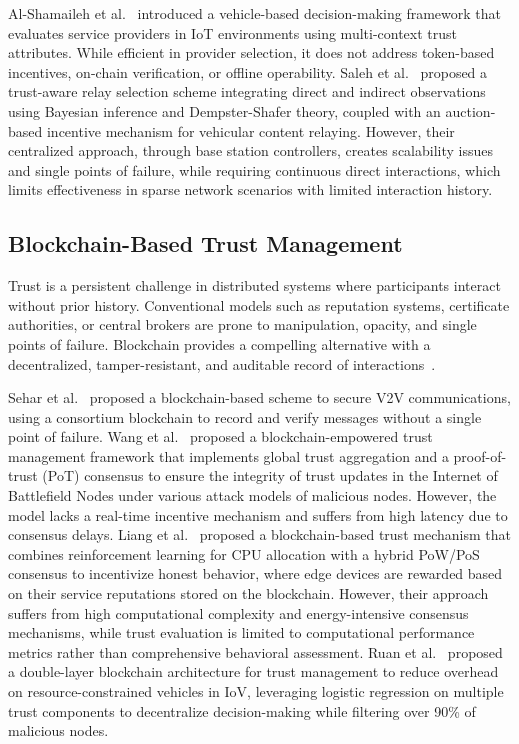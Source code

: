 \cite{cho2010survey}\documentclass[journal,comsoc,twoside]{IEEEtran}
\begin{document}
Al-Shamaileh et al.~\cite{Mohammad} introduced a vehicle-based decision-making framework that evaluates service providers in IoT environments using multi-context trust attributes. While efficient in provider selection, it does not address token-based incentives, on-chain verification, or offline operability. 
Saleh et al.~\cite{Saleh} proposed a trust-aware relay selection scheme integrating direct and indirect observations using Bayesian inference and Dempster-Shafer theory, coupled with an auction-based incentive mechanism for vehicular content relaying. However, their centralized approach, through base station controllers, creates scalability issues and single points of failure, while requiring continuous direct interactions, which limits effectiveness in sparse network scenarios with limited interaction history.

\subsection{Blockchain-Based Trust Management}
Trust is a persistent challenge in distributed systems where participants interact without prior history. Conventional models such as reputation systems, certificate authorities, or central brokers are prone to manipulation, opacity, and single points of failure. Blockchain provides a compelling alternative with a decentralized, tamper-resistant, and auditable record of interactions~\cite{ahakonye2024tides}.

Sehar et al.~\cite{sehar} proposed a blockchain-based scheme to secure V2V communications, using a consortium blockchain to record and verify messages without a single point of failure. 
Wang et al.~\cite{wang} proposed a blockchain-empowered trust management framework that implements global trust aggregation and a proof-of-trust (PoT) consensus to ensure the integrity of trust updates in the Internet of Battlefield Nodes under various attack models of malicious nodes. However, the model lacks a real-time incentive mechanism and suffers from high latency due to consensus delays. Liang et al.~\cite{Liang} proposed a blockchain-based trust mechanism that combines reinforcement learning for CPU allocation with a hybrid PoW/PoS consensus to incentivize honest behavior, where edge devices are rewarded based on their service reputations stored on the blockchain. However, their approach suffers from high computational complexity and energy-intensive consensus mechanisms, while trust evaluation is limited to computational performance metrics rather than comprehensive behavioral assessment. Ruan et al.~\cite{ruan} proposed a double-layer blockchain architecture for trust management to reduce overhead on resource-constrained vehicles in IoV, leveraging logistic regression on multiple trust components to decentralize decision-making while filtering over 90\% of malicious nodes.
\end{document}
